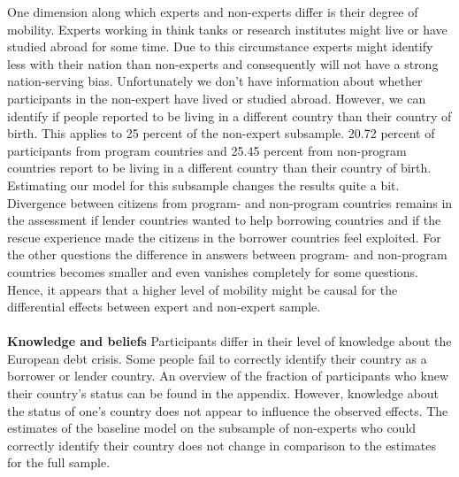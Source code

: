 One dimension along which experts and non-experts differ is their degree of mobility. Experts working in think tanks or research institutes might live or have studied abroad for some time. Due to this circumstance experts might identify less with their nation than non-experts and consequently will not have a strong nation-serving bias. Unfortunately we don't have information about whether participants in the non-expert have lived or studied abroad. However, we can identify if people reported to be living in a different country than their country of birth. This applies to 25 percent of the non-expert subsample. 20.72 percent of participants from program countries and 25.45 percent from non-program countries report to be living in a different country than their country of birth. Estimating our model for this subsample changes the results quite a bit. Divergence between citizens from program- and non-program countries remains in the assessment if lender countries wanted to help borrowing countries and if the rescue experience made the citizens in the borrower countries feel exploited. For the other questions the difference in answers between program- and non-program countries becomes smaller and even vanishes completely for some questions. Hence, it appears that a higher level of mobility might be causal for the differential effects between expert and non-expert sample.  \\

\\
\textbf{Knowledge and beliefs} 
Participants differ in their level of knowledge about the European debt crisis. Some people fail to correctly identify their country as a borrower or lender country. An overview of the fraction of participants who knew their country's status can be found in the appendix. However, knowledge about the status of one's country does not appear to influence the observed effects. The estimates of the baseline model on the subsample of non-experts who could correctly identify their country does not change in comparison to the estimates for the full sample. 

